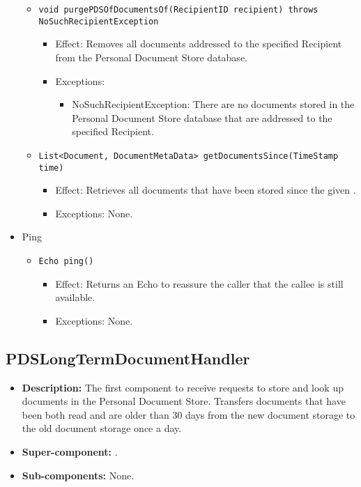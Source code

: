 \begin{itemize}
\begin{itemize}
		\item \texttt{void purgePDSOfDocumentsOf(RecipientID recipient) throws NoSuchRecipientException}
		\begin{itemize}
			\item Effect: Removes all documents addressed to the specified Recipient from the Personal Document Store database.
			\item Exceptions:
			\begin{itemize}
				\item NoSuchRecipientException: There are no documents stored in the Personal Document Store database that are addressed to the specified Recipient.
			\end{itemize}
		\end{itemize}

		\item \texttt{List<Document, DocumentMetaData> getDocumentsSince(TimeStamp time)}
		\begin{itemize}
			\item Effect: Retrieves all documents that have been stored since the given .
			\item Exceptions: None.
		\end{itemize}
	\end{itemize}

	\item Ping
	\begin{itemize}
		\item \texttt{Echo ping()}
		\begin{itemize}
			\item Effect: Returns an Echo to reassure the caller that the callee is still available.
			\item Exceptions: None.
		\end{itemize}
	\end{itemize}
\end{itemize}

\subsection{PDSLongTermDocumentHandler}
\begin{itemize}
    \item \textbf{Description:} The first component to receive requests to store and look up documents in the Personal Document Store. Transfers documents that have been both read and are older than 30 days from the new document storage to the old document storage once a day.
    \item \textbf{Super-component:} .
    \item \textbf{Sub-components:} None.
\end{itemize}


